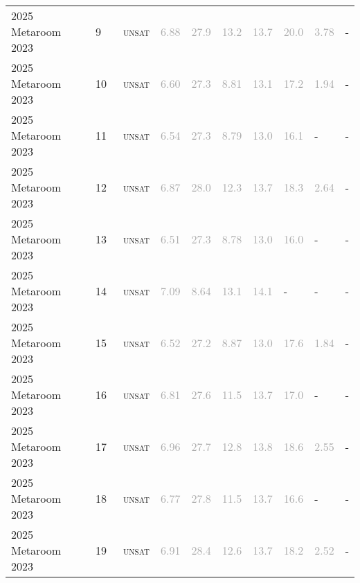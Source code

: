 \begin{center}
{\begin{longtable}{@{}llllllllll@{}}
2025 Metaroom 2023 & 9 & ~\textsc{unsat} & \textcolor{darkgray}{6.88} & \textcolor{darkgray}{27.9} & \textcolor{darkgray}{13.2} & \textcolor{darkgray}{13.7} & \textcolor{darkgray}{20.0} & \textcolor{darkgray}{3.78} & - \\
2025 Metaroom 2023 & 10 & ~\textsc{unsat} & \textcolor{darkgray}{6.60} & \textcolor{darkgray}{27.3} & \textcolor{darkgray}{8.81} & \textcolor{darkgray}{13.1} & \textcolor{darkgray}{17.2} & \textcolor{darkgray}{1.94} & - \\
2025 Metaroom 2023 & 11 & ~\textsc{unsat} & \textcolor{darkgray}{6.54} & \textcolor{darkgray}{27.3} & \textcolor{darkgray}{8.79} & \textcolor{darkgray}{13.0} & \textcolor{darkgray}{16.1} & - & - \\
2025 Metaroom 2023 & 12 & ~\textsc{unsat} & \textcolor{darkgray}{6.87} & \textcolor{darkgray}{28.0} & \textcolor{darkgray}{12.3} & \textcolor{darkgray}{13.7} & \textcolor{darkgray}{18.3} & \textcolor{darkgray}{2.64} & - \\
2025 Metaroom 2023 & 13 & ~\textsc{unsat} & \textcolor{darkgray}{6.51} & \textcolor{darkgray}{27.3} & \textcolor{darkgray}{8.78} & \textcolor{darkgray}{13.0} & \textcolor{darkgray}{16.0} & - & - \\
2025 Metaroom 2023 & 14 & ~\textsc{unsat} & \textcolor{darkgray}{7.09} & \textcolor{darkgray}{8.64} & \textcolor{darkgray}{13.1} & \textcolor{darkgray}{14.1} & - & - & - \\
2025 Metaroom 2023 & 15 & ~\textsc{unsat} & \textcolor{darkgray}{6.52} & \textcolor{darkgray}{27.2} & \textcolor{darkgray}{8.87} & \textcolor{darkgray}{13.0} & \textcolor{darkgray}{17.6} & \textcolor{darkgray}{1.84} & - \\
2025 Metaroom 2023 & 16 & ~\textsc{unsat} & \textcolor{darkgray}{6.81} & \textcolor{darkgray}{27.6} & \textcolor{darkgray}{11.5} & \textcolor{darkgray}{13.7} & \textcolor{darkgray}{17.0} & - & - \\
2025 Metaroom 2023 & 17 & ~\textsc{unsat} & \textcolor{darkgray}{6.96} & \textcolor{darkgray}{27.7} & \textcolor{darkgray}{12.8} & \textcolor{darkgray}{13.8} & \textcolor{darkgray}{18.6} & \textcolor{darkgray}{2.55} & - \\
2025 Metaroom 2023 & 18 & ~\textsc{unsat} & \textcolor{darkgray}{6.77} & \textcolor{darkgray}{27.8} & \textcolor{darkgray}{11.5} & \textcolor{darkgray}{13.7} & \textcolor{darkgray}{16.6} & - & - \\
2025 Metaroom 2023 & 19 & ~\textsc{unsat} & \textcolor{darkgray}{6.91} & \textcolor{darkgray}{28.4} & \textcolor{darkgray}{12.6} & \textcolor{darkgray}{13.7} & \textcolor{darkgray}{18.2} & \textcolor{darkgray}{2.52} & - \\

\end{longtable}}
\end{center}
